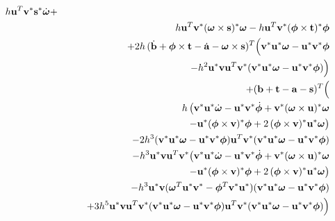 \begin{eqnarray}
        h\ve{u}^T\dual{\ve{v}}\dual{\ve{s}}\dot{\ve{\omega}} + \nonumber\\*&&
        h\ve{u}^T\dual{\ve{v}}\dual{(\ve{\omega}\times\ve{s})}\ve{\omega} -
        h\ve{u}^T\dual{\ve{v}}\dual{(\ve{\phi}\times\ve{t})}\ve{\phi} \nonumber\\*&&
        +2h\,(\dot{\ve{b}} + \ve{\phi}\times\ve{t} - \dot{\ve{a}} - \ve{\omega}\times\ve{s})^T
        \Big(\dual{\ve{v}}\dual{\ve{u}}\ve{\omega} - \dual{\ve{u}}\dual{\ve{v}}\ve{\phi}
        \nonumber\\*&&\quad\quad -h^2\dual{\ve{u}}\ve{v}\ve{u}^T\dual{\ve{v}}
        (\dual{\ve{v}}\dual{\ve{u}}\ve{\omega} - \dual{\ve{u}}\dual{\ve{v}}\ve{\phi})\Big)
        \nonumber\\*&& +(\ve{b} + \ve{t} - \ve{a} - \ve{s})^T \Big(
        \nonumber\\*&&\quad\quad h\,\big(
        \dual{\ve{v}}\dual{\ve{u}}\dot{\ve{\omega}} - \dual{\ve{u}}\dual{\ve{v}}\dot{\ve{\phi}} +
        \dual{\ve{v}}\dual{(\ve{\omega}\times\ve{u})}\ve{\omega} \nonumber\\*&&\quad\quad\quad\quad
        -\dual{\ve{u}}\dual{(\ve{\phi}\times\ve{v})}\ve{\phi} +
        2\,\dual{(\ve{\phi}\times\ve{v})}\dual{\ve{u}}\ve{\omega} \big)
        \nonumber\\*&&\quad\quad
        -2h^3 (\dual{\ve{v}}\dual{\ve{u}}\ve{\omega} - \dual{\ve{u}}\dual{\ve{v}}\ve{\phi})
        \ve{u}^T\dual{\ve{v}}
        (\dual{\ve{v}}\dual{\ve{u}}\ve{\omega} - \dual{\ve{u}}\dual{\ve{v}}\ve{\phi})
        \nonumber\\*&&\quad\quad
        -h^3\dual{\ve{u}}\ve{v}\ve{u}^T\dual{\ve{v}} \big(
        \dual{\ve{v}}\dual{\ve{u}}\dot{\ve{\omega}} - \dual{\ve{u}}\dual{\ve{v}}\dot{\ve{\phi}} +
        \dual{\ve{v}}\dual{(\ve{\omega}\times\ve{u})}\ve{\omega} \nonumber\\*&&\quad\quad\quad\quad
        -\dual{\ve{u}}\dual{(\ve{\phi}\times\ve{v})}\ve{\phi} +
        2\,\dual{(\ve{\phi}\times\ve{v})}\dual{\ve{u}}\ve{\omega} \big)
        \nonumber\\*&&\quad\quad
        -h^3 \dual{\ve{u}}\ve{v}
        (\ve{\omega}^T\dual{\ve{u}}\dual{\ve{v}} - \ve{\phi}^T\dual{\ve{v}}\dual{\ve{u}})
        (\dual{\ve{v}}\dual{\ve{u}}\ve{\omega} - \dual{\ve{u}}\dual{\ve{v}}\ve{\phi})
        \nonumber\\*&&\quad\quad
        +3h^5 \dual{\ve{u}}\ve{v} \ve{u}^T\dual{\ve{v}}
        (\dual{\ve{v}}\dual{\ve{u}}\ve{\omega} - \dual{\ve{u}}\dual{\ve{v}}\ve{\phi})
        \ve{u}^T\dual{\ve{v}}
        (\dual{\ve{v}}\dual{\ve{u}}\ve{\omega} - \dual{\ve{u}}\dual{\ve{v}}\ve{\phi}) \Big) \nonumber
\end{eqnarray}

